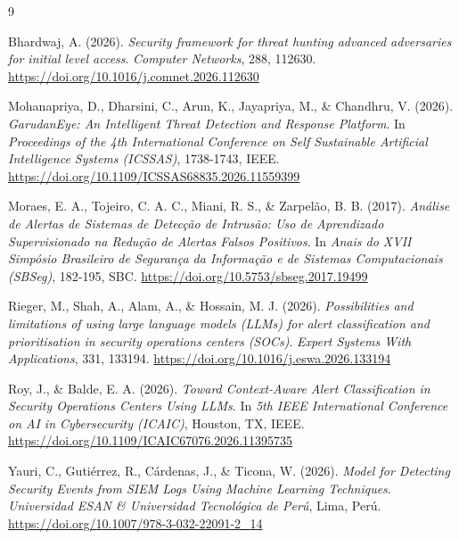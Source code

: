 \documentclass[12pt,a4paper]{article}
\begin{document}
\newpage
\renewcommand\refname{Referências}
\begin{thebibliography}{9}

Bhardwaj, A. (2026).
\textit{Security framework for threat hunting advanced adversaries for initial level access}. \textit{Computer Networks}, 288, 112630. \url{https://doi.org/10.1016/j.comnet.2026.112630}

Mohanapriya, D., Dharsini, C., Arun, K., Jayapriya, M., \& Chandhru, V. (2026).
\textit{GarudanEye: An Intelligent Threat Detection and Response Platform}. In \textit{Proceedings of the 4th International Conference on Self Sustainable Artificial Intelligence Systems (ICSSAS)}, 1738-1743, IEEE. \url{https://doi.org/10.1109/ICSSAS68835.2026.11559399}

Moraes, E. A., Tojeiro, C. A. C., Miani, R. S., \& Zarpelão, B. B. (2017).
\textit{Análise de Alertas de Sistemas de Detecção de Intrusão: Uso de Aprendizado Supervisionado na Redução de Alertas Falsos Positivos}. In \textit{Anais do XVII Simpósio Brasileiro de Segurança da Informação e de Sistemas Computacionais (SBSeg)}, 182-195, SBC.
\url{https://doi.org/10.5753/sbseg.2017.19499}

Rieger, M., Shah, A., Alam, A., \& Hossain, M. J. (2026).
\textit{Possibilities and limitations of using large language models (LLMs) for alert classification and prioritisation in security operations centers (SOCs)}. \textit{Expert Systems With Applications}, 331, 133194. \url{https://doi.org/10.1016/j.eswa.2026.133194}

Roy, J., \& Balde, E. A. (2026).
\textit{Toward Context-Aware Alert Classification in Security Operations Centers Using LLMs}. In \textit{5th IEEE International Conference on AI in Cybersecurity (ICAIC)}, Houston, TX, IEEE.
\url{https://doi.org/10.1109/ICAIC67076.2026.11395735}

Yauri, C., Gutiérrez, R., Cárdenas, J., \& Ticona, W. (2026).
\textit{Model for Detecting Security Events from SIEM Logs Using Machine Learning Techniques}. \textit{Universidad ESAN \& Universidad Tecnológica de Perú}, Lima, Perú.
\url{https://doi.org/10.1007/978-3-032-22091-2_14}

\end{thebibliography}
\end{document}
